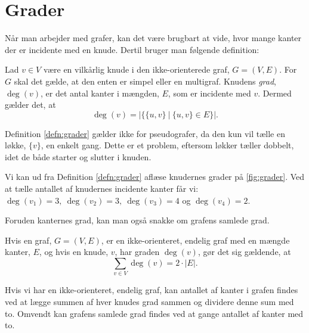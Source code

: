 \section{Grader} \label{sec:grader}
Når man arbejder med grafer, kan det være brugbart at vide, hvor mange kanter der er incidente med en knude. Dertil bruger man følgende definition:

\begin{defn}[Grader] \label{defn:grader}
Lad $v \in V$ være en vilkårlig knude i den ikke-orienterede graf, $G = (V,E)$. For $G$ skal det gælde, at den enten er simpel eller en multigraf. Knudens \emph{grad}, $\deg(v)$, er det antal kanter i mængden, $E$, som er incidente med $v$. Dermed gælder det, at
\begin{equation}
\deg(v)=|\{ \{u,v\} \ | \ \{u,v\}\in E \}|.
\end{equation}
\end{defn}

Definition \ref{defn:grader} gælder ikke for pseudografer, da den kun vil tælle en løkke, $\{v\}$, en enkelt gang. Dette er et problem, eftersom løkker tæller dobbelt, idet de både starter og slutter i knuden.

\begin{exmp} \label{ex:grader}

Vi kan ud fra Definition \ref{defn:grader} aflæse knudernes grader på \autoref{fig:grader}. Ved at tælle antallet af knudernes incidente kanter får vi: $\deg(v_{1})=3, \ \deg(v_{2})=3, \ \deg(v_{3})=4$ og $\deg(v_{4})=2$.


\end{exmp}

Foruden kanternes grad, kan man også snakke om grafens samlede grad.

\begin{thm}
Hvis en graf, $G = (V,E)$, er en ikke-orienteret, endelig graf med en mængde kanter, $E$, og hvis en knude, $v$, har graden $\deg(v)$, gør det sig gældende, at
\begin{equation} \label{eq:degv=2e}
	\sum_{v \in V} { } \deg(v) = 2 \cdot |E|.
\end{equation}
\end{thm}

Hvis vi har en ikke-orienteret, endelig graf, kan antallet af kanter i grafen findes ved at lægge summen af hver knudes grad sammen og dividere denne sum med to. Omvendt kan grafens samlede grad findes ved at gange antallet af kanter med to.

